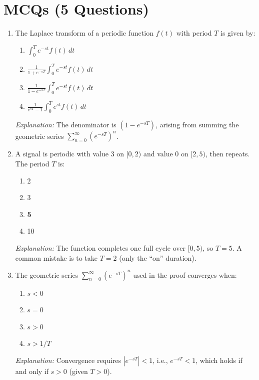 \documentclass[12pt,a4paper]{article}
\begin{document}
\section{MCQs (5 Questions)}

\begin{enumerate}[label=\textbf{MCQ \arabic*.}, leftmargin=*]

\item The Laplace transform of a periodic function $f(t)$ with period $T$
is given by:

\begin{enumerate}[label=(\alph*), noitemsep]
  \item $\displaystyle\int_0^T e^{-st} f(t)\,dt$
  \item $\displaystyle\frac{1}{1+e^{-sT}} \int_0^T e^{-st} f(t)\,dt$
  \item \textbf{$\displaystyle\frac{1}{1-e^{-sT}} \int_0^T e^{-st} f(t)\,dt$}
  \item $\displaystyle\frac{1}{e^{sT}-1} \int_0^T e^{st} f(t)\,dt$
\end{enumerate}
\textit{Explanation:} The denominator is $(1-e^{-sT})$, arising from summing
the geometric series $\sum_{n=0}^{\infty}(e^{-sT})^n$.

\item A signal is periodic with value 3 on $[0, 2)$ and value 0 on $[2, 5)$,
then repeats. The period $T$ is:

\begin{enumerate}[label=(\alph*), noitemsep]
  \item 2
  \item 3
  \item \textbf{5}
  \item 10
\end{enumerate}
\textit{Explanation:} The function completes one full cycle over $[0,5)$, so
$T = 5$. A common mistake is to take $T = 2$ (only the ``on'' duration).

\item The geometric series $\sum_{n=0}^{\infty}(e^{-sT})^n$ used in the proof
converges when:

\begin{enumerate}[label=(\alph*), noitemsep]
  \item $s < 0$
  \item $s = 0$
  \item \textbf{$s > 0$}
  \item $s > 1/T$
\end{enumerate}
\textit{Explanation:} Convergence requires $|e^{-sT}| < 1$, i.e., $e^{-sT} < 1$,
which holds if and only if $s > 0$ (given $T > 0$).


\end{enumerate}
\end{document}
